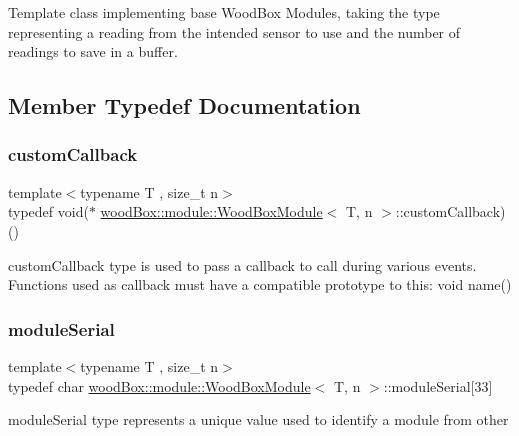 Template class implementing base Wood\+Box Modules, taking the type representing a reading from the intended sensor to use and the number of readings to save in a buffer. 

\subsection{Member Typedef Documentation}
\mbox{\label{classwood_box_1_1module_1_1_wood_box_module_ab6d400f05cc572fb9fd28dd0baf6d346}} 
\subsubsection{\texorpdfstring{custom\+Callback}{customCallback}}
{\footnotesize\ttfamily template$<$typename T , size\+\_\+t n$>$ \\
typedef void($\ast$ \mbox{\hyperlink{classwood_box_1_1module_1_1_wood_box_module}{wood\+Box\+::module\+::\+Wood\+Box\+Module}}$<$ T, n $>$\+::custom\+Callback) ()}

custom\+Callback type is used to pass a callback to call during various events. Functions used as callback must have a compatible prototype to this\+: void name() \mbox{\label{classwood_box_1_1module_1_1_wood_box_module_a3a6503bbd5147a06ba50081f97177b46}} 
\subsubsection{\texorpdfstring{module\+Serial}{moduleSerial}}
{\footnotesize\ttfamily template$<$typename T , size\+\_\+t n$>$ \\
typedef char \mbox{\hyperlink{classwood_box_1_1module_1_1_wood_box_module}{wood\+Box\+::module\+::\+Wood\+Box\+Module}}$<$ T, n $>$\+::module\+Serial\mbox{[}33\mbox{]}}

module\+Serial type represents a unique value used to identify a module from other \mbox{\label{classwood_box_1_1module_1_1_wood_box_module_adf5d59bae2980ff138284d0fa885df19}} 
